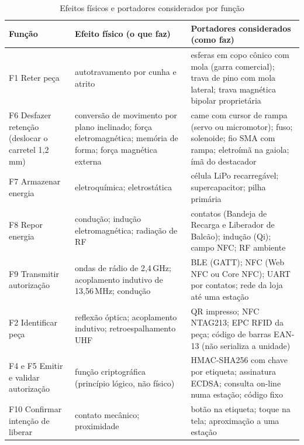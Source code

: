 \begin{table}[htbp]
    \centering
    \caption{Efeitos físicos e portadores considerados por função}
    \label{tab:r2-efeitos}
    \footnotesize
    \renewcommand{\arraystretch}{1.25}
    \begin{tabularx}{\textwidth}{@{}
        >{\RaggedRight\arraybackslash}p{3.3cm}
        >{\RaggedRight\arraybackslash}p{4.6cm}
        >{\RaggedRight\arraybackslash}X@{}}
        \toprule
        \textbf{Função} & \textbf{Efeito físico (o que faz)} & \textbf{Portadores considerados (como faz)} \\
        \midrule
        F1 Reter peça & autotravamento por cunha e atrito & esferas em copo cônico com mola (garra comercial); trava de pino com mola lateral; trava magnética bipolar proprietária \\
        \addlinespace
        F6 Desfazer retenção (deslocar o carretel 1,2\,mm) & conversão de movimento por plano inclinado; força eletromagnética; memória de forma; força magnética externa & came com cursor de rampa (servo ou micromotor); fuso; solenoide; fio SMA com rampa; eletroímã na gaiola; ímã do destacador \\
        \addlinespace
        F7 Armazenar energia & eletroquímica; eletrostática & célula LiPo recarregável; supercapacitor; pilha primária \\
        \addlinespace
        F8 Repor energia & condução; indução eletromagnética; radiação de RF & contatos (Bandeja de Recarga e Liberador de Balcão); indução (Qi); campo NFC; RF ambiente \\
        \addlinespace
        F9 Transmitir autorização & ondas de rádio de 2,4\,GHz; acoplamento indutivo de 13,56\,MHz; condução & BLE (GATT); NFC (Web NFC ou Core NFC); UART por contatos; rede da loja até uma estação \\
        \addlinespace
        F2 Identificar peça & reflexão óptica; acoplamento indutivo; retroespalhamento UHF & QR impresso; NFC NTAG213; EPC RFID da peça; código de barras EAN-13 (não serializa a unidade) \\
        \addlinespace
        F4 e F5 Emitir e validar autorização & função criptográfica (princípio lógico, não físico) & HMAC-SHA256 com chave por etiqueta; assinatura ECDSA; consulta on-line numa estação; código fixo \\
        \addlinespace
        F10 Confirmar intenção de liberar & contato mecânico; proximidade & botão na etiqueta; toque na tela; aproximação a uma estação \\

\end{tabularx}
\end{table}
